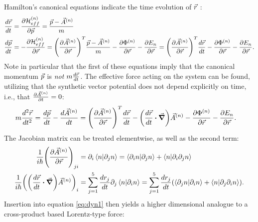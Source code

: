 \documentclass[a4paper]{article}
\begin{document}
Hamilton's canonical equations indicate the time evolution of \(\vec{r}\) :%
\begin{align*} %
        \frac{d \va{r}}{d t} &= \frac{\partial \mathbb{\cal H}^{(n)}_{eff}}{\partial \va{p}} = \frac{\va{p} -
 \va{A}^{(n)}}{m}\\ %
                \frac{d \va{p}}{d t}  &= -\frac{\partial \mathbb{\cal H}^{(n)}_{eff}}{\partial \va{r}}=
                \pqty{\frac{\partial
 \va{A}^{(n)}}{\partial \va{r}}}^T \frac{\va{p}-\va{A}^{(n)}}{m} -\frac{\partial \Phi^{(n)}}{\partial \va{r}}
 -\frac{\partial E_n}{\partial \va{r}} = \pqty{\frac{\partial
 \va{A}^{(n)}}{\partial \va{r}}}^T \frac{d \va{r}}{d t} - \frac{\partial
\Phi^{(n)}}{\partial \va{r}} - \frac{\partial E_n}{\partial \va{r}}  
.\end{align*}
Note in particular that the first of these equations imply that the canonical momentum \(\vec{p}\) is
\textit{not} \(m \frac{d \vec{r}}{d t} \). The effective force acting on the
system can be found, utilizing that the synthetic vector potential does not depend explicitly
on time, i.e., that \(\frac{\partial \vec{A}^{(n)}}{\partial t}  = 0\):
\begin{align}\label{eq:dyn1}
        m \frac{d^2 \va{r}}{d t^2} &= \frac{d \va{p}}{d
        t} - \frac{d \va{A}^{(n)}}{d t}  = \pqty{\frac{\partial \va{A}^{(n)}}{\partial \va{r}}}^T \frac{d
\va{r}}{d t} - \pqty{\frac{d \va{r}}{d t}  \vdot \grad}\va{A}^{(n)}
-\frac{\partial \Phi^{(n)}}{\partial \va{r}} - \frac{\partial E_n}{\partial \va{r}}  
.\end{align}
The Jacobian matrix can be treated elementwise, as well as the second term: 
\begin{align*}
        \frac{1}{i\hbar{}}\pqty{\frac{\partial \va{A}^{(n)}}{\partial \va{r}}}_{ji} &= \partial_i
        \bra{n}\ket{\partial_j n} = \bra{\partial_i n}\ket{\partial_j n} +
        \bra{n}\ket{\partial_i \partial_j n}\\
        \frac{1}{i\hbar{}}\pqty{\pqty{\frac{d \va{r}}{d t} \vdot \grad}
\va{A}^{(n)}}_i &= \sum_{j=1}^{5} \frac{d r_j}{d t} \partial_j
                \bra{n}\ket{\partial_i n} =\sum_{j=1}^{5}  \frac{d r_j}{d
                        t}\pqty{ \bra{\partial_j
                n}\ket{\partial_i n} + \bra{n}\ket{\partial_j \partial_i n}}
.\end{align*}
Insertion into equation \ref{eq:dyn1} then yields a higher dimensional analogue to a
cross-product based Lorentz-type force:
\end{document}
